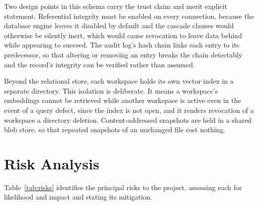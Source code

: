 \documentclass{FastFyp}
\begin{document}
Two design points in this schema carry the trust claim and merit explicit statement. Referential integrity must be enabled on every connection, because the database engine leaves it disabled by default and the cascade clauses would otherwise be silently inert, which would cause revocation to leave data behind while appearing to succeed. The audit log's hash chain links each entry to its predecessor, so that altering or removing an entry breaks the chain detectably and the record's integrity can be verified rather than assumed.

Beyond the relational store, each workspace holds its own vector index in a separate directory. This isolation is deliberate. It means a workspace's embeddings cannot be retrieved while another workspace is active even in the event of a query defect, since the index is not open, and it renders revocation of a workspace a directory deletion. Content-addressed snapshots are held in a shared blob store, so that repeated snapshots of an unchanged file cost nothing.

\section{Risk Analysis}
Table~\ref{tab:risks} identifies the principal risks to the project, assessing each for likelihood and impact and stating its mitigation.
\end{document}
